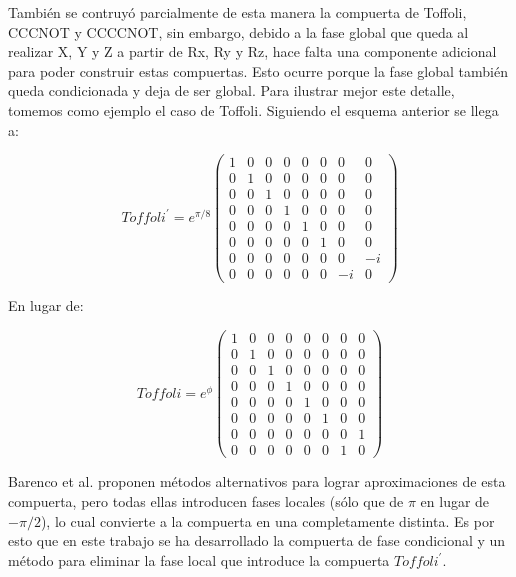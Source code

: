 También se contruyó parcialmente de esta manera la compuerta de Toffoli, CCCNOT y CCCCNOT, sin embargo, debido a la fase global que queda al realizar X, Y y Z a partir de Rx, Ry y Rz, hace falta una componente adicional para poder construir estas compuertas. Esto ocurre porque la fase global también queda condicionada y deja de ser global. Para ilustrar mejor este detalle, tomemos como ejemplo el caso de Toffoli. Siguiendo el esquema anterior se llega a:

\begin{equation}
    Toffoli^\prime =
    e^{\pi/8}
    \begin{pmatrix}
        1 & 0 & 0 & 0 & 0 & 0 & 0 & 0 \\
        0 & 1 & 0 & 0 & 0 & 0 & 0 & 0 \\
        0 & 0 & 1 & 0 & 0 & 0 & 0 & 0 \\
        0 & 0 & 0 & 1 & 0 & 0 & 0 & 0 \\
        0 & 0 & 0 & 0 & 1 & 0 & 0 & 0 \\
        0 & 0 & 0 & 0 & 0 & 1 & 0 & 0 \\
        0 & 0 & 0 & 0 & 0 & 0 & 0 & -i \\
        0 & 0 & 0 & 0 & 0 & 0 & -i & 0
    \end{pmatrix}
\end{equation}

En lugar de:

\begin{equation}
    Toffoli =
    e^{\phi}
    \begin{pmatrix}
        1 & 0 & 0 & 0 & 0 & 0 & 0 & 0 \\
        0 & 1 & 0 & 0 & 0 & 0 & 0 & 0 \\
        0 & 0 & 1 & 0 & 0 & 0 & 0 & 0 \\
        0 & 0 & 0 & 1 & 0 & 0 & 0 & 0 \\
        0 & 0 & 0 & 0 & 1 & 0 & 0 & 0 \\
        0 & 0 & 0 & 0 & 0 & 1 & 0 & 0 \\
        0 & 0 & 0 & 0 & 0 & 0 & 0 & 1 \\
        0 & 0 & 0 & 0 & 0 & 0 & 1 & 0
    \end{pmatrix}
\end{equation}

Barenco et al. proponen métodos alternativos para lograr aproximaciones de esta compuerta, pero todas ellas introducen fases locales (sólo que de $\pi$ en lugar de $-\pi/2$), lo cual convierte a la compuerta en una completamente distinta. Es por esto que en este trabajo se ha desarrollado la compuerta de fase condicional y un método para eliminar la fase local que introduce la compuerta $Toffoli^\prime$.

